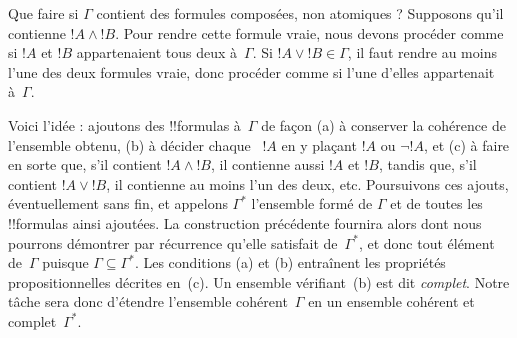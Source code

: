 \documentclass[../../../include/open-logic-section]{subfiles}
\begin{document}
Que faire si $\Gamma$ contient des formules composées, non atomiques ?
Supposons qu'il contienne $!A\land !B$. Pour rendre cette formule
vraie, nous devons procéder comme si $!A$ et $!B$ appartenaient tous
deux à~$\Gamma$. Si $!A\lor !B\in\Gamma$, il faut rendre au moins
l'une des deux formules vraie, donc procéder comme si l'une d'elles
appartenait à~$\Gamma$.

Voici l'idée : ajoutons des !!{formula}s à~$\Gamma$ de façon
(a) à conserver la cohérence de l'ensemble obtenu, (b) à décider
chaque ~$!A$ en y plaçant
$!A$ ou $\lnot !A$, et (c) à faire en sorte que, s'il contient
$!A\land !B$, il contienne
aussi $!A$ et $!B$, tandis que, s'il contient $!A\lor !B$, il
contienne au moins l'un des deux, etc. Poursuivons ces ajouts,
éventuellement sans fin, et appelons $\Gamma^*$ l'ensemble formé de
$\Gamma$ et de toutes les !!{formula}s ainsi
ajoutées. La construction précédente fournira alors
dont nous pourrons démontrer par récurrence qu'elle satisfait
de~$\Gamma^*$, et donc tout élément de~$\Gamma$ puisque
$\Gamma\subseteq\Gamma^*$. Les conditions (a) et (b) entraînent
les propriétés propositionnelles décrites en~(c).
Un ensemble vérifiant~(b) est dit \emph{complet}. Notre tâche sera
donc d'étendre l'ensemble cohérent~$\Gamma$ en un ensemble cohérent
et complet~$\Gamma^*$.
\end{document}
